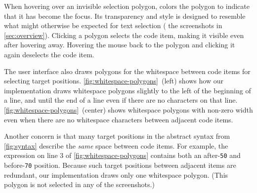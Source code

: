 When hovering over an invisible selection polygon, 
\deuce{} colors the polygon to indicate that it has become the focus. Its
transparency and style is designed to resemble what might
otherwise be expected for text selection (\cf{} the screenshots in
\autoref{sec:overview}). Clicking a polygon selects the code item, making it visible even
after hovering away. Hovering the mouse back to the polygon and clicking it
again deselects the code item.



The user interface also draws polygons for the whitespace between code items for
selecting target positions.
%
\autoref{fig:whitespace-polygons}~(left) shows how our implementation draws
whitespace polygons slightly to the left of the beginning of a line, and until
the end of a line even if there are no characters on that line.
\autoref{fig:whitespace-polygons}~(center) shows whitespace polygons with
non-zero width even when there are no whitespace characters between adjacent code
items.

\begin{comment}
We make several design decisions to help with these concerns. First, when the
lines in have a program have different lengths, we ``pad'' whitespace polygons at the end
of each line to span to the maximum column width. For example, for the
whitespace polygon above \verb+redSquare+ in \autoref{fig:whitespace-polygons}~(left),
notice how the polygon on line 1 spans to the length of line 4 (the
longest line in the program) even though that line 1 has zero characters. Second, for
whitespace polygons that end at column 0, we begin the polygon slightly to the
left of column 0 (\eg{} the polygons on lines 1, 2, and 4 of
\autoref{fig:whitespace-polygons}~(left)). Third, when there is exactly one newline in
the whitespace, we draw a line from the end of the first line to the beginning
of the second so that the polygon is connected (\eg{} the polygon that spans lines
3 and 4 of \autoref{fig:whitespace-polygons}~(left).
Fourth, when there is no whitespace between
adjacent items, we draw a slim polygon rather than one with zero width.
To demonstrate, \autoref{fig:whitespace-polygons}~(center) shows all of the
0-character whitespace polygons in a selected state.
\end{comment}

Another concern is that many target positions in the abstract syntax from
\autoref{fig:syntax} describe the \emph{same} space between code items. For
example, the expression
on line 3 of
\autoref{fig:whitespace-polygons} contains both an after-\verb+50+ and before-\verb+70+
position. Because such target positions between adjacent items are redundant,
our implementation draws only one whitespace polygon. (This polygon is not
selected in any of the screenshots.)

